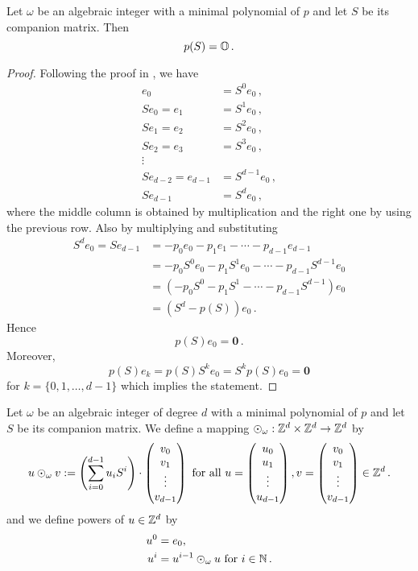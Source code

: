 \begin{lem}
\label{lem:compMatrixIsRoot}
Let $\omega$ be an algebraic integer with a minimal polynomial of $p$ and let $S$ be its companion matrix. Then
$$
p(S)=\mathbb{O}\,.
$$
\end{lem}
\begin{proof}
Following the proof in \cite{horn}, we have
\begin{align*}
e_0&=S^0 e_0\,, \\
S e_0= e_1&=S^1 e_0\,, \\
S e_1= e_2&=S^2 e_0\,, \\
S e_2= e_3&=S^3 e_0\,, \\
\vdots & \\
S e_{d-2}= e_{d-1}&=S^{d-1} e_0\,, \\
S e_{d-1} &= S^{d} e_0\,,
\end{align*}
where the middle column is obtained by multiplication and the right one by using the previous row. 
Also by multiplying and substituting
\begin{align*}
S^{d} e_0=S e_{d-1}&= -p_0e_0-p_1e_1-\cdots-p_{d-1}e_{d-1} \\
    &= -p_0 S^{0}e_0-p_1S^{1}e_0-\cdots-p_{d-1}S^{d-1}e_{0} \\
    &= (-p_0 S^{0}-p_1S^{1}-\cdots-p_{d-1}S^{d-1})e_{0} \\
    &=(S^{d}-p(S))e_0\,.
\end{align*}
Hence
$$
p(S)e_0=\mathbf{0}\,.
$$
Moreover,
$$
p(S)e_k=p(S)S^k e_0=S^k p(S) e_0=\mathbf{0}
$$
for $k=\{0,1,\dots,d-1\}$ which implies the statement.
\end{proof}

\begin{defn}
Let $\omega$ be an algebraic integer of degree $d$ with a minimal polynomial of $p$ and let $S$ be its companion matrix. We define a mapping $\odot_\omega: \mathbb{Z}^d \times \mathbb{Z}^d \rightarrow \mathbb{Z}^d$ by 
$$
u \odot_\omega v := \left(\sum_{i=0}^{d-1} {u}_i S^i\right)\cdot \begin{pmatrix} {v}_0 \\ {v}_1 \\ \vdots \\ {v}_{d-1} \end{pmatrix} \text{ for all } u=\begin{pmatrix} {u}_0 \\ {u}_1 \\ \vdots \\ {u}_{d-1} \end{pmatrix}, v=\begin{pmatrix} {v}_0 \\ {v}_1 \\ \vdots \\ {v}_{d-1} \end{pmatrix} \in \mathbb{Z}^d\,.
$$ 
and we define powers of $u \in \mathbb{Z}^d$ by
\begin{align*}
    u^0&=e_0, \\
    u^{i}&= u^{i-1} \odot_\omega u \text{ for } i\in\mathbb{N}\,.
\end{align*}
\end{defn}

